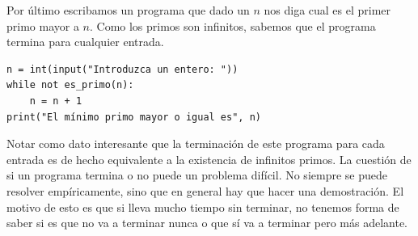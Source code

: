 \documentclass[a4paper, 12pt]{report}
\theoremstyle{definition}
\begin{document}
Por último escribamos un programa que dado un $n$ nos diga cual es el primer primo mayor a $n$. Como los primos son infinitos, sabemos que el programa termina para cualquier entrada.
\begin{verbatim}
n = int(input("Introduzca un entero: "))
while not es_primo(n):
    n = n + 1
print("El mínimo primo mayor o igual es", n)
\end{verbatim}
Notar como dato interesante que la terminación de este programa para cada entrada es de hecho equivalente a la existencia de infinitos primos. La cuestión de si un programa termina o no puede un problema difícil. No siempre se puede resolver empíricamente, sino que en general hay que hacer una demostración. El motivo de esto es que si lleva mucho tiempo sin terminar, no tenemos forma de saber si es que no va a terminar nunca o que sí va a terminar pero más adelante.
\end{document}
